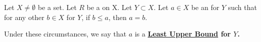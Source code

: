 \label{def:LeastUpperBound}

\newcommand{\LeastUpperBound}[0]{
    \bf \hyperref[def:LeastUpperBound]{Least Upper Bound} \rm
}

\newcommand{\Sup}[0]{
    \bf \hyperref[def:LeastUpperBound]{Sup} \rm
}

\newcommand{\Supremum}[0]{
    \bf \hyperref[def:LeastUpperBound]{Supremum} \rm
}

\begin{df}
    Let $X \neq \emptyset$ be a set. 
    Let $R$ be a \Relation on X. 
    Let $Y \subset X$.
    Let $a \in X$ be an \UpperBound for $Y$
    such that for any other
    \UpperBound $b \in X$ for $Y$, if 
    $b \leq a$, then $a = b$.
    
    Under these circumstances, we say that $a$ 
    is a \LeastUpperBound for $Y$. 
\end{df}